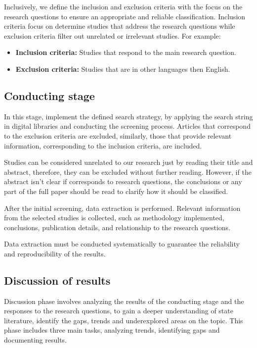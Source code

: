 Inclusively, we define the inclusion and exclusion criteria with the focus on the research questions to ensure an appropriate and reliable classification. Inclusion criteria focus on determine studies that address the research questions while exclusion criteria filter out unrelated or irrelevant studies. For example:
 \begin{itemize}
    \item \textbf{Inclusion criteria:} Studies that respond to the main research question.
    \item \textbf{Exclusion criteria:} Studies that are in other languages then English.
 \end{itemize}

 \subsection{Conducting stage}
In this stage, implement the defined search strategy, by applying the search string in digital libraries and conducting the screening process. Articles that correspond to the exclusion criteria are excluded, similarly, those that provide relevant information, corresponding to the inclusion criteria, are included.

Studies can be considered unrelated to our research just by reading their title and abstract, therefore, they can be excluded without further reading. However, if the abstract isn’t clear if corresponds to research questions, the conclusions or any part of the full paper should be read to clarify how it should be classified. 

After the initial screening, data extraction is performed. Relevant information from the selected studies is collected, such as methodology implemented, conclusions, publication details, and relationship to the research questions.

Data extraction must be conducted systematically to guarantee the reliability and reproducibility of the results.

\subsection{Discussion of results}
Discussion phase involves analyzing the results of the conducting stage and the responses to the research questions, to gain a deeper understanding of state literature, identify the gaps, trends and underexplored areas on the topic. This phase includes three main tasks, analyzing trends, identifying gaps and documenting results. 


